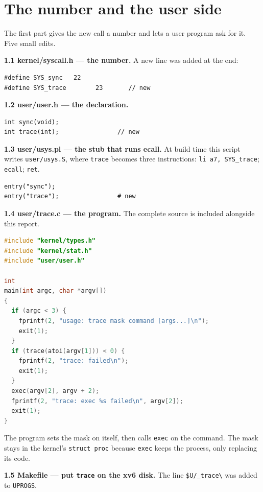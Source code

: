 \documentclass[12pt,a4paper]{article}
\begin{document}
\section{The number and the user side}

The first part gives the new call a number and lets a user program ask for it. Five small edits.

\textbf{1.1 kernel/syscall.h --- the number.} A new line was added at the end:

\begin{lstlisting}
#define SYS_sync   22
#define SYS_trace        23       // new
\end{lstlisting}

\textbf{1.2 user/user.h --- the declaration.}

\begin{lstlisting}
int sync(void);
int trace(int);                // new
\end{lstlisting}

\textbf{1.3 user/usys.pl --- the stub that runs ecall.} At build time this script writes \texttt{user/usys.S}, where \texttt{trace} becomes three instructions: \texttt{li a7, SYS\_trace}; \texttt{ecall}; \texttt{ret}.

\begin{lstlisting}
entry("sync");
entry("trace");                # new
\end{lstlisting}

\textbf{1.4 user/trace.c --- the program.} The complete source is included alongside this report.

\begin{lstlisting}[language=C]
#include "kernel/types.h"
#include "kernel/stat.h"
#include "user/user.h"

int
main(int argc, char *argv[])
{
  if (argc < 3) {
    fprintf(2, "usage: trace mask command [args...]\n");
    exit(1);
  }
  if (trace(atoi(argv[1])) < 0) {
    fprintf(2, "trace: failed\n");
    exit(1);
  }
  exec(argv[2], argv + 2);
  fprintf(2, "trace: exec %s failed\n", argv[2]);
  exit(1);
}
\end{lstlisting}

The program sets the mask on itself, then calls \texttt{exec} on the command. The mask stays in the kernel's \texttt{struct proc} because \texttt{exec} keeps the process, only replacing its code.

\textbf{1.5 Makefile --- put \texttt{trace} on the xv6 disk.} The line \texttt{\$U/\_trace\textbackslash} was added to \texttt{UPROGS}.
\end{document}
